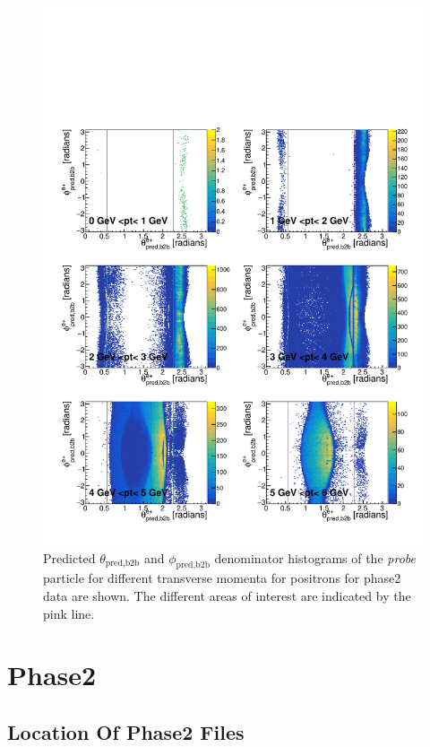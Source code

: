\documentclass[a4paper,11pt,twosided,final,german,openbib,pdftex,listof=totoc,bibliography=totoc]{scrbook}
\begin{document}
\begin{appendix}
\begin{figure}[h!]
	\includegraphics[width=\textwidth]{Plots/master/RTPtMepE_Data.pdf}
	\caption[Enumerator $\theta_{\textrm{pred,b2b}}$-$\phi_{\textrm{pred,b2b}}$ Positron Transverse Momentum Phase2 Data]{Predicted $\theta_{\textrm{pred,b2b}}$ and $\phi_{\textrm{pred,b2b}}$ denominator histograms of the \textit{probe} particle for different transverse momenta for positrons for phase2 data are shown. The different areas of interest are indicated by the pink line.}
	\label{plt:RTtPMepE_Data}
\end{figure}


\clearpage
\section{Phase2}
\label{A:2}


\subsection{Location Of Phase2 Files}


\end{appendix}
\end{document}
